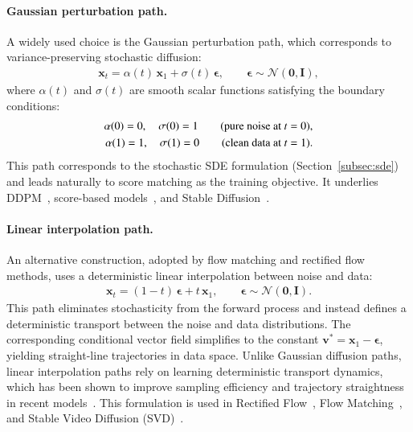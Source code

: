 \paragraph{Gaussian perturbation path.}
A widely used choice is the Gaussian perturbation path, which corresponds to variance-preserving stochastic diffusion:
\begin{align}
    \mathbf{x}_t = \alpha(t)\,\mathbf{x}_1 + \sigma(t)\,\boldsymbol{\epsilon}, \qquad \boldsymbol{\epsilon} \sim \mathcal{N}(\mathbf{0}, \mathbf{I}),
    \label{eq:gaussian_interpolant}
\end{align}
where $\alpha(t)$ and $\sigma(t)$ are smooth scalar functions satisfying the boundary conditions:
\begin{align}
    \alpha(0) = 0,\quad \sigma(0) = 1 \qquad \text{(pure noise at } t=0\text{)}, \notag\\
    \alpha(1) = 1,\quad \sigma(1) = 0 \qquad \text{(clean data at } t=1\text{)}.
    \label{eq:path_conditions}
\end{align}
This path corresponds to the stochastic SDE formulation (Section~\ref{subsec:sde}) and leads naturally to score matching as the training objective. It underlies DDPM~\cite{ho2020denoising}, score-based models~\cite{song2021scorebased}, and Stable Diffusion~\cite{rombach2022highresolution}.

\paragraph{Linear interpolation path.}
An alternative construction, adopted by flow matching and rectified flow methods, uses a deterministic linear interpolation between noise and data:
\begin{align}
    \mathbf{x}_t = (1 - t)\,\boldsymbol{\epsilon} + t\,\mathbf{x}_1, \qquad \boldsymbol{\epsilon} \sim \mathcal{N}(\mathbf{0}, \mathbf{I}).
    \label{eq:linear_interpolant}
\end{align}
This path eliminates stochasticity from the forward process and instead defines a deterministic transport between the noise and data distributions. The corresponding conditional vector field simplifies to the constant $\mathbf{v}^* = \mathbf{x}_1 - \boldsymbol{\epsilon}$, yielding straight-line trajectories in data space. Unlike Gaussian diffusion paths, linear interpolation paths rely on learning deterministic transport dynamics, which has been shown to improve sampling efficiency and trajectory straightness in recent models~\cite{liu2023flow, lipman2023flow}. This formulation is used in Rectified Flow~\cite{liu2023flow}, Flow Matching~\cite{lipman2023flow}, and Stable Video Diffusion (SVD)~\cite{blattmann2023stable}.

